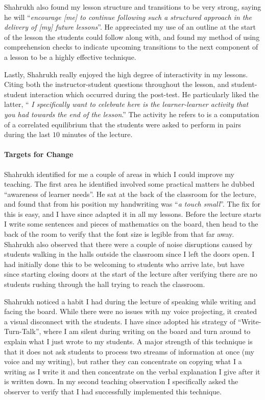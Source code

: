 \documentclass{article}
\begin{document}
Shahrukh also found my lesson structure and transitions to be very strong, saying he will ``\emph{encourage [me] to continue
following such a structured approach in the delivery of [my] future lessons}''. He appreciated my use of an outline at the start of the lesson the students could follow along with, and found my method of using comprehension checks to indicate upcoming transitions to the next component of a lesson to be a highly effective technique.

Lastly, Shahrukh really enjoyed the high degree of interactivity in my lessons. Citing both the instructor-student questions throughout the lesson, and student-student interaction which occurred during the post-test. He particularly liked the latter, ``\emph{ I specifically want to celebrate here is the learner-learner
activity that you had towards the end of the lesson}.'' The activity he refers to is a computation of a correlated equilibrium that the students were asked to perform in pairs during the last $10$ minutes of the lecture.

\paragraph{Targets for Change} Shahrukh identified for me a couple of areas in which I could improve my teaching. The first area he identified involved some practical matters he dubbed ``awareness of learner needs''. He sat at the back of the classroom for the lecture, and found that from his position my handwriting was ``\emph{a touch small}''. The fix for this is easy, and I have since adapted it in all my lessons. Before the lecture starts I write some sentences and pieces of mathematics on the board, then head to the back of the room to verify that the font size is legible from that far away. Shahrukh also observed that there were a couple of noise disruptions caused by students walking in the halls outside the classroom since I left the doors open. I had initially done this to be welcoming to students who arrive late, but have since starting closing doors at the start of the lecture after verifying there are no students rushing through the hall trying to reach the classroom.

Shahrukh noticed a habit I had during the lecture of speaking while writing and facing the board. While there were no issues with my voice projecting, it created a visual disconnect with the students. I have since adopted his strategy of ``Write-Turn-Talk'', where I am silent during writing on the board and turn around to explain what I just wrote to my students. A major strength of this technique is that it does not ask students to process two streams of information at once (my voice and my writing), but rather they can concentrate on copying what I a writing as I write it and then concentrate on the verbal explanation I give after it is written down. In my second teaching observation I specifically asked the observer to verify that I had successfully implemented this technique.
\end{document}
